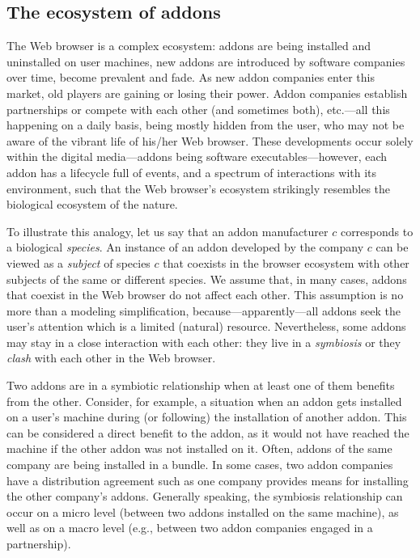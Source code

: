 \documentclass[ijoc,nonblindrev]{informs3} %
\numberwithin{equation}{subsection}
\begin{document}
\subsection{The ecosystem of addons}

The Web browser is a complex ecosystem: addons are being installed and uninstalled on user machines, new addons are introduced by software companies over time, become prevalent and fade. As new addon companies enter this market, old players are gaining or losing their power. Addon companies establish partnerships or compete with each other (and sometimes both), etc.---all this happening on a daily basis, being mostly hidden from the user, who may not be aware of the vibrant life of his/her Web browser. These developments occur solely within the digital media---addons being software executables---however, each addon has a lifecycle full of events, and a spectrum of interactions with its environment, such that the Web browser's ecosystem strikingly resembles the biological ecosystem of the nature.

To illustrate this analogy, let us say that an addon manufacturer $c$ corresponds to a biological \emph{species}. An instance of an addon developed by the company $c$ can be viewed as a \emph{subject} of species $c$ that coexists in the browser ecosystem with other subjects of the same or different species. We assume that, in many cases, addons that coexist in the Web browser do not affect each other. This assumption is no more than a modeling simplification, because---apparently---all addons seek the user's attention which is a limited (natural) resource. Nevertheless, some addons may stay in a close interaction with each other: they live in a \emph{symbiosis} or they \emph{clash} with each other in the Web browser.

Two addons are in a symbiotic relationship when at least one of them benefits from the other. Consider, for example, a situation when an addon gets installed on a user's machine during (or following) the installation of another addon. This can be considered a direct benefit to the addon, as it would not have reached the machine if the other addon was not installed on it. Often, addons of the same company are being installed in a bundle. In some cases, two addon companies have a distribution agreement such as one company provides means for installing the other company's addons. Generally speaking, the symbiosis relationship can occur on a micro level (between two addons installed on the same machine), as well as on a macro level (e.g., between two addon companies engaged in a partnership).
\end{document}
